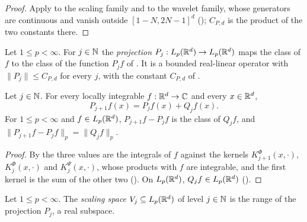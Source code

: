 \begin{proof}
\leanok
{}
Apply  to the scaling family and to the wavelet family, whose
generators are continuous and vanish outside $[1 - N, 2N - 1]^d$
(); $C_{P,d}$ is the product of the two constants there.
\end{proof}

\begin{definition}
\label{def:daub-rd-lp-proj}
\leanok
{}
Let $1 \leq p < \infty$. For $j \in \mathbb{N}$ the \emph{projection}
$P_j : L_p(\mathbb{R}^d) \to L_p(\mathbb{R}^d)$ maps the class of $f$ to the class of the function $P_j f$ of
. It is a bounded real-linear operator with $\|P_j\| \leq C_{P,d}$ for
every $j$, with the constant $C_{P,d}$ of .
\end{definition}

\begin{theorem}
\label{thm:daub-rd-block-identity}
\leanok
{}
Let $j \in \mathbb{N}$. For every locally integrable $f : \mathbb{R}^d \to \mathbb{C}$ and every $x \in \mathbb{R}^d$,
\[
  P_{j+1} f(x) = P_j f(x) + Q_j f(x) .
\]
For $1 \leq p < \infty$ and $f \in L_p(\mathbb{R}^d)$, $P_{j+1} f - P_j f$ is the class of $Q_j f$, and
$\|P_{j+1} f - P_j f\|_p = \|Q_j f\|_p$.
\end{theorem}

\begin{proof}
\leanok
{}
By  the three values are the integrals of $f$ against the kernels
$K^\Phi_{j+1}(x, \cdot)$, $K^\Phi_j(x, \cdot)$ and $K^\Psi_j(x, \cdot)$, whose products with $f$
are integrable, and the first kernel is the sum of the other two
(). On $L_p(\mathbb{R}^d)$, $Q_j f \in L_p(\mathbb{R}^d)$
().
\end{proof}

\begin{definition}
\label{def:daub-rd-scaling-spaces}
\leanok
{}
Let $1 \leq p < \infty$. The \emph{scaling space} $V_j \subseteq L_p(\mathbb{R}^d)$ of level $j \in \mathbb{N}$
is the range of the projection $P_j$, a real subspace.
\end{definition}


